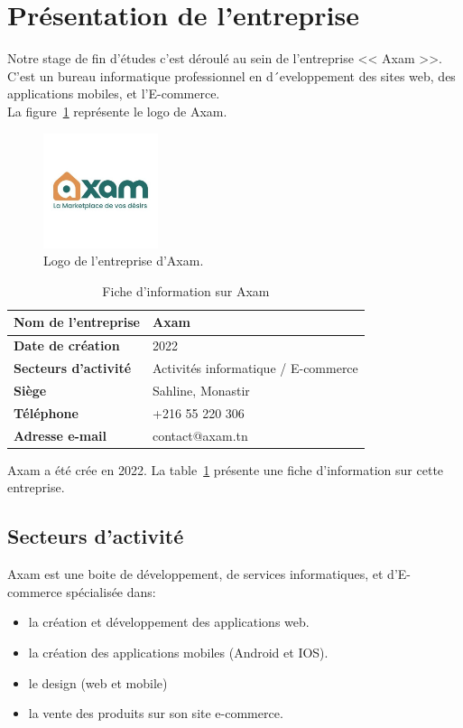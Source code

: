 \section{Présentation de l'entreprise}
\noindent
\large
Notre stage de fin d'études c'est déroulé au sein de l'entreprise << Axam >>. C'est un bureau informatique professionnel en d´eveloppement des sites web, des applications mobiles, et l'E-commerce. \\
La figure~\ref{fig:axam} représente le logo de Axam.
\begin{figure}[H]
\centering
\includegraphics[width=0.3\textwidth]{logos/axam.png}
\caption{Logo de l'entreprise d'Axam.}
\label{fig:axam}
\end{figure}

\begin{table}[H]
\centering %
\begin{tabular}{|>{\bfseries}m{5cm}|m{8cm}|}
\hline
\rowcolor{blue!20} %
Nom de l’entreprise & Axam \\
\hline
Date de création & 2022 \\
\hline
Secteurs d’activité & Activités informatique / E-commerce\\
\hline
Siège & Sahline, Monastir \\
\hline
Téléphone & +216 55 220 306 \\
\hline
Adresse e-mail & contact@axam.tn \\
\hline
\end{tabular}
\caption{Fiche d’information sur Axam}
\label{tab:axam}
\end{table}

Axam a été crée en 2022. La table~\ref{tab:axam} présente une fiche d’information sur cette entreprise.

\newpage
\subsection{Secteurs d’activité}
\noindent
Axam est une boite de développement, de services informatiques, et d'E-commerce spécialisée dans:
\begin{itemize}
    \item la création et développement des applications web.
    \item la création des applications mobiles (Android et IOS).
    \item le design (web et mobile)
    \item la vente des produits sur son site e-commerce.
\end{itemize}